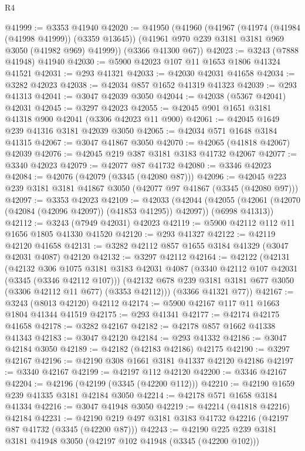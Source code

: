 \begin{lexlean}{R4}
\begin{coremodule}
@41999 := @3353 @41940
@42020 := @41950
    (@41960
      (@41967
        (@41974 (@41984 (@41998 @41999)) (@3359 @13645))
        (@41961 @970 @239 @3181 @3181 @969 @3050 (@41982 @969) @41999))
      (@3366 @41300 @67))
@42023 := @3243 (@7888 @41948) @41940
@42030 := @5900 @42023 @107 @11 @1653 @1806 @41324 @41521
@42031 := @293 @41321
@42033 := @42030 @42031 @41658
@42034 := @3282 @42023
@42038 := @42034 @857 @1652 @41319 @41323
@42039 := @293 @41313
@42041 := @3047 @42039 @3050
@42044 := @42038 (@5367 @42041) @42031
@42045 := @3297 @42023
@42055 := @42045 @901 @1651 @3181 @41318 @900 @42041 (@3306 @42023 @11 @900)
@42061 := @42045 @1649 @239 @41316 @3181 @42039 @3050
@42065 := @42034 @571 @1648 @3184 @41315
@42067 := @3047 @41867 @3050
@42070 := @42065 (@41818 @42067) @42039
@42076 := @42045 @219 @387 @3181 @3183 @41732 @42067
@42077 := @3340 @42023
@42079 := @42077 @87 @41732
@42080 := @3346 @42023
@42084 := @42076 (@42079 (@3345 (@42080 @87)))
@42096 := @42045 @223 @239 @3181 @3181 @41867 @3050 (@42077 @97 @41867 (@3345 (@42080 @97)))
@42097 := @3353 @42023
@42109 := @42033
    (@42044
      (@42055 (@42061 (@42070 (@42084 (@42096 @42097)) (@41853 @41295)) @42097))
      (@6998 @41313))
@42112 := @3243 (@7949 @42031) @42023
@42119 := @5900 @42112 @112 @11 @1656 @1805 @41330 @41520
@42120 := @293 @41327
@42122 := @42119 @42120 @41658
@42131 := @3282 @42112 @857 @1655 @3184 @41329 (@3047 @42031 @4087) @42120
@42132 := @3297 @42112
@42164 := @42122
    (@42131
      (@42132
        @306
        @1075
        @3181
        @3183
        @42031
        @4087
        (@3340 @42112 @107 @42031 (@3345 (@3346 @42112 @107)))
        (@42132 @678 @239 @3181 @3181 @677 @3050 (@3306 @42112 @11 @677) (@3353 @42112)))
      (@3366 @41321 @77))
@42167 := @3243 (@8013 @42120) @42112
@42174 := @5900 @42167 @117 @11 @1663 @1804 @41344 @41519
@42175 := @293 @41341
@42177 := @42174 @42175 @41658
@42178 := @3282 @42167
@42182 := @42178 @857 @1662 @41338 @41343
@42183 := @3047 @42120
@42184 := @293 @41332
@42186 := @3047 @42184 @3050
@42189 := @42182 (@42183 @42186) @42175
@42190 := @3297 @42167
@42196 := @42190 @308 @1661 @3181 @41337 @42120 @42186
@42197 := @3340 @42167
@42199 := @42197 @112 @42120
@42200 := @3346 @42167
@42204 := @42196 (@42199 (@3345 (@42200 @112)))
@42210 := @42190 @1659 @239 @41335 @3181 @42184 @3050
@42214 := @42178 @571 @1658 @3184 @41334
@42216 := @3047 @41948 @3050
@42219 := @42214 (@41818 @42216) @42184
@42231 := @42190 @219 @497 @3181 @3183 @41732 @42216 (@42197 @87 @41732 (@3345 (@42200 @87)))
@42243 := @42190 @225 @239 @3181 @3181 @41948 @3050 (@42197 @102 @41948 (@3345 (@42200 @102)))

\end{coremodule}
\end{lexlean}
